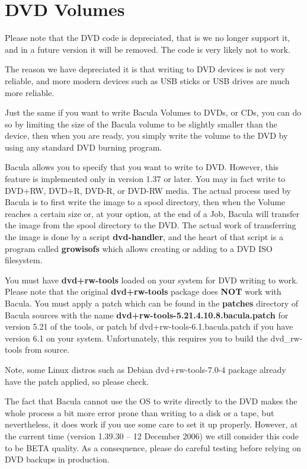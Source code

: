 
\chapter{DVD Volumes}
\label{_DVDChapterStart}

Please note that the DVD code is depreciated, that is
we no longer support it, and in a future version it will
be removed.  The code is very likely not to work.

The reason we have depreciated it is that writing to DVD
devices is not very reliable, and more modern devices
such as USB sticks or USB drives are much more reliable.

Just the same if you want to write Bacula Volumes to DVDs,
or CDs, you can do so by limiting the size of the Bacula
volume to be slightly smaller than the device, then when
you are ready, you simply write the volume to the DVD by
using any standard DVD burning program.

Bacula allows you to specify that you want to write to DVD. However,
this feature is implemented only in version 1.37 or later.
You may in fact write to DVD+RW, DVD+R, DVD-R, or DVD-RW 
media. The actual process used by Bacula is to first write
the image to a spool directory, then when the Volume reaches
a certain size or,  at your option, at the end of a Job, Bacula
will transfer the image from the spool directory to the
DVD.  The actual work of transferring the image is done
by a script {\bf dvd-handler}, and the heart of that
script is a program called {\bf growisofs} which allows
creating or adding to a DVD ISO filesystem.

You must have {\bf dvd+rw-tools} loaded on your system for DVD writing to
work.  Please note that the original {\bf dvd+rw-tools} package does {\bf
NOT} work with Bacula.  You must apply a patch which can be found in the
{\bf patches} directory of Bacula sources with the name
{\bf dvd+rw-tools-5.21.4.10.8.bacula.patch} for version 5.21 of the tools,
or patch {bf dvd+rw-tools-6.1.bacula.patch} if you have version 6.1       
on your system. Unfortunately, this requires you to build the dvd\_rw-tools
from source.

Note, some Linux distros such as Debian dvd+rw-tools-7.0-4 package already
have the patch applied, so please check.

The fact that Bacula cannot use the OS to write directly
to the DVD makes the whole process a bit more error prone than
writing to a disk or a tape, but nevertheless, it does work if you
use some care to set it up properly. However, at the current time
(version 1.39.30 -- 12 December 2006) we still consider this code to be
BETA quality.  As a consequence, please do careful testing before relying
on DVD backups in production.

